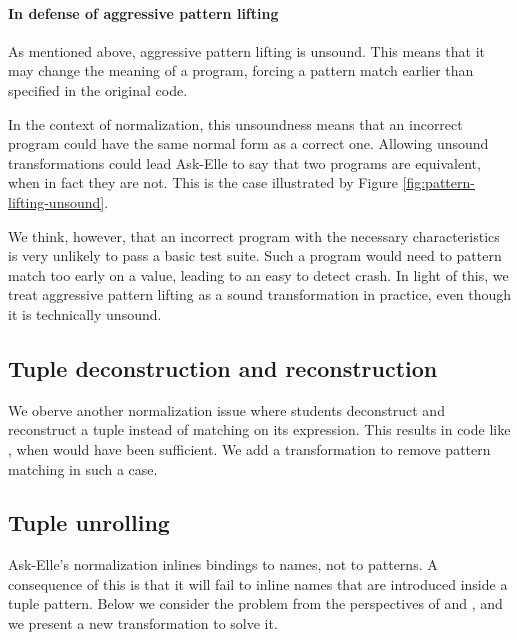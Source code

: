 \paragraph{In defense of aggressive pattern lifting}

As mentioned above, aggressive pattern lifting is unsound. This means that it may change the meaning of a program, forcing a pattern match earlier than specified in the original code.

In the context of normalization, this unsoundness means that an incorrect program could have the same normal form as a correct one. Allowing unsound transformations could lead Ask-Elle to say that two programs are equivalent, when in fact they are not. This is the case illustrated by Figure \ref{fig:pattern-lifting-unsound}.

We think, however, that an incorrect program with the necessary characteristics is very unlikely to pass a basic test suite. Such a program would need to pattern match too early on a value, leading to an easy to detect crash. In light of this, we treat aggressive pattern lifting as a sound transformation in practice, even though it is technically unsound.



\subsection{Tuple deconstruction and reconstruction}

We oberve another normalization issue where students deconstruct and reconstruct a tuple instead of matching on its expression. This results in code like , when  would have been sufficient. We add a transformation to remove pattern matching in such a case.

\subsection{Tuple unrolling}

Ask-Elle's normalization inlines bindings to names, not to patterns. A consequence of this is that it will fail to inline names that are introduced inside a tuple pattern. Below we consider the problem from the perspectives of  and , and we present a new transformation to solve it.

